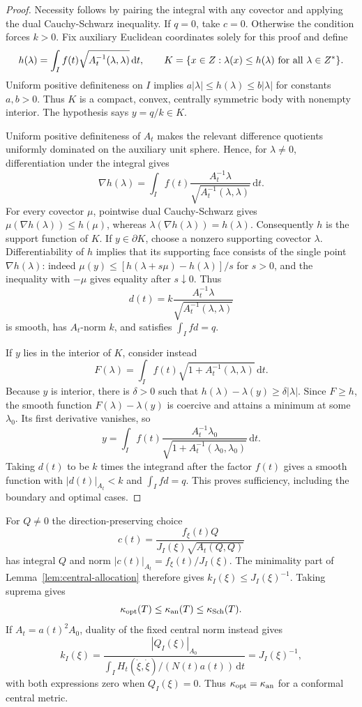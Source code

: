 \documentclass[10pt,a4paper]{article}
\numberwithin{equation}{section}
\theoremstyle{definition}
\theoremstyle{remark}
\newcommand{\dd}{\mathrm d}
\begin{document}
\begin{proof}
Necessity follows by pairing the integral with any covector and applying
the dual Cauchy-Schwarz inequality.  If $q=0$, take $c=0$.
Otherwise the condition forces $k>0$.  Fix auxiliary Euclidean
coordinates solely for this proof and define
\[
 h(\lambda)=\int_I f(t)
                    \sqrt{A_t^{-1}(\lambda,\lambda)}\,\dd t,
 \qquad
 K=\{x\in Z:\lambda(x)\le h(\lambda)\ \hbox{for all }\lambda\in Z^*\}.
\]
Uniform positive definiteness on $I$ implies
$a|\lambda|\le h(\lambda)\le b|\lambda|$ for constants $a,b>0$.
Thus $K$ is a compact, convex, centrally symmetric body with nonempty
interior.  The hypothesis says $y=q/k\in K$.

Uniform positive definiteness of $A_t$ makes the relevant difference
quotients uniformly dominated on the auxiliary unit sphere.  Hence, for
$\lambda\ne0$, differentiation under the integral gives
\[
 \nabla h(\lambda)=\int_I f(t)
 \frac{A_t^{-1}\lambda}{\sqrt{A_t^{-1}(\lambda,\lambda)}}\,\dd t.
\]
For every covector $\mu$, pointwise dual Cauchy-Schwarz gives
$\mu(\nabla h(\lambda))\le h(\mu)$, whereas
$\lambda(\nabla h(\lambda))=h(\lambda)$.  Consequently $h$ is the
support function of $K$.  If $y\in\partial K$, choose a nonzero
supporting covector $\lambda$.  Differentiability of $h$ implies that
its supporting face consists of the single point $\nabla h(\lambda)$:
indeed $\mu(y)\le [h(\lambda+s\mu)-h(\lambda)]/s$ for $s>0$,
and the inequality with $-\mu$ gives equality after $s\downarrow0$.
Thus
\[
 d(t)=k\frac{A_t^{-1}\lambda}
                 {\sqrt{A_t^{-1}(\lambda,\lambda)}}
\]
is smooth, has $A_t$-norm $k$, and satisfies $\int_I fd=q$.

If $y$ lies in the interior of $K$, consider instead
\[
 F(\lambda)=\int_I f(t)
                  \sqrt{1+A_t^{-1}(\lambda,\lambda)}\,\dd t.
\]
Because $y$ is interior, there is $\delta>0$ such that
$h(\lambda)-\lambda(y)\ge\delta|\lambda|$.  Since $F\ge h$,
the smooth function $F(\lambda)-\lambda(y)$ is coercive and attains a
minimum at some $\lambda_0$.  Its first derivative vanishes, so
\[
 y=\int_I f(t)
       \frac{A_t^{-1}\lambda_0}
            {\sqrt{1+A_t^{-1}(\lambda_0,\lambda_0)}}\,\dd t.
\]
Taking $d(t)$ to be $k$ times the integrand after the factor $f(t)$
gives a smooth function with $|d(t)|_{A_t}<k$ and $\int_I fd=q$.
This proves sufficiency, including the boundary and optimal cases.
\end{proof}

For $Q\ne0$ the direction-preserving choice
\[
 c(t)=\frac{f_\xi(t)Q}{J_I(\xi)\sqrt{A_t(Q,Q)}}
\]
has integral $Q$ and norm $|c(t)|_{A_t}=f_\xi(t)/J_I(\xi)$.
The minimality part of Lemma~\ref{lem:central-allocation} therefore
gives $k_I(\xi)\le J_I(\xi)^{-1}$.
Taking suprema gives
\begin{equation}\label{eq:optimal-anisotropic-comparison}
 \kappa_{\rm opt}(T)\le\kappa_{\rm an}(T)\le\kappa_{\rm Sch}(T).
\end{equation}
If $A_t=a(t)^2A_0$, duality of the fixed central norm instead gives
\[
 k_I(\xi)=\frac{|Q_I(\xi)|_{A_0}}
 {\int_I H_t(\dot\xi,\dot\xi)/(N(t)a(t))\,\dd t}
 =J_I(\xi)^{-1},
\]
with both expressions zero when $Q_I(\xi)=0$.  Thus
$\kappa_{\rm opt}=\kappa_{\rm an}$ for a conformal central metric.
\end{document}
